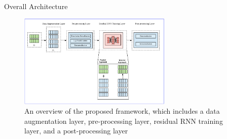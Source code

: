 \documentclass{beamer}
\begin{document}
\begin{frame}{Overall Architecture }
   \begin{figure}[htbp]
\centerline{\includegraphics[width=0.65\textwidth]{images/rp5_arch}}
\caption{ \tiny An overview of the proposed framework, which includes a data augmentation layer, pre-processing
layer, residual RNN training layer, and a post-processing layer}
\label{forecastingarch}
\end{figure}
\end{frame}
\end{document}
